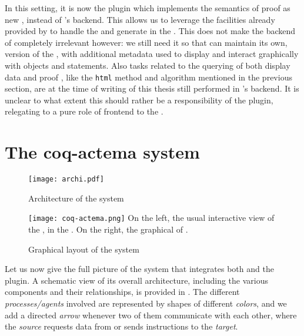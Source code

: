 In this setting, it is now the  plugin which implements the semantics of
proof  as new , instead of 's backend. This allows
us to leverage the facilities already provided by  to handle the
 and generate  in the . This does not make the backend of  completely
irrelevant however: we still need it so that  can maintain its own,
 version of the , with additional metadata used
to display and interact graphically with objects and statements. Also tasks
related to the querying of both display data and proof , like the
\texttt{html} method and  algorithm mentioned in the previous
section, are at the time of writing of this thesis still performed in
's backend. It is unclear to what extent this should rather be a
responsibility of the  plugin, relegating  to a pure role of
frontend to the .

\section{The coq-actema system}

\begin{figure*}
  \texttt{[image: archi.pdf]}
  \caption{Architecture of the  system}
\end{figure*}

\begin{figure*}
  \texttt{[image: coq-actema.png]}
  \AP On the left, the usual interactive view of the , in the
    \cite{VsCoq}. On the right, the graphical  of
  .
  \caption{ Graphical layout of the  system}
\end{figure*}

Let us now give the full picture of the  system that integrates
both  and the  plugin. A schematic view of its overall
architecture, including the various components and their relationships, is
provided in . The different \emph{processes/agents} involved are
represented by shapes of different \emph{colors}, and we add a directed
\emph{arrow} whenever two of them communicate with each other, where the
\emph{source} requests data from or sends instructions to the \emph{target}.

